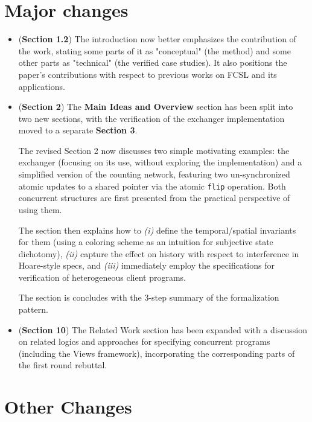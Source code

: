\documentclass{article}
\begin{document}
\section*{Major changes}
\label{sec:major-changes}

\begin{itemize}

\item (\textbf{Section 1.2}) The introduction now better emphasizes
  the contribution of the work, stating some parts of it as
  "conceptual" (the method) and some other parts as "technical" (the
  verified case studies). It also positions the paper's contributions
  with respect to previous works on FCSL and its applications.

\item (\textbf{Section 2}) The \textbf{Main Ideas and Overview}
  section has
  been split into two new sections, with the verification of the
  exchanger implementation moved to a separate \textbf{Section 3}.

  The revised Section 2 now discusses two simple motivating examples:
  the exchanger (focusing on its use, without exploring the
  implementation) and a simplified version of the counting network,
  featuring two un-synchronized atomic updates to a shared
  pointer via the atomic \texttt{flip} operation. Both concurrent
  structures are first presented from the
  practical perspective of using them.

    The section then explains how to \emph{(i)} define the temporal/spatial
    invariants for them (using a coloring scheme as an intuition for
    subjective state dichotomy), \emph{(ii)} capture the effect on history
    with respect to interference in Hoare-style specs, and
    \emph{(iii)}
    immediately employ the specifications for verification of
    heterogeneous client programs.

    The section is concludes with the 3-step summary of the
    formalization pattern.

  \item (\textbf{Section 10}) The Related Work section has been
    expanded with a discussion on related logics and approaches for
    specifying concurrent programs (including the Views framework),
    incorporating the corresponding parts of the first round rebuttal.

\end{itemize}

\section*{Other Changes}
\label{sec:other-changes}
\end{document}
